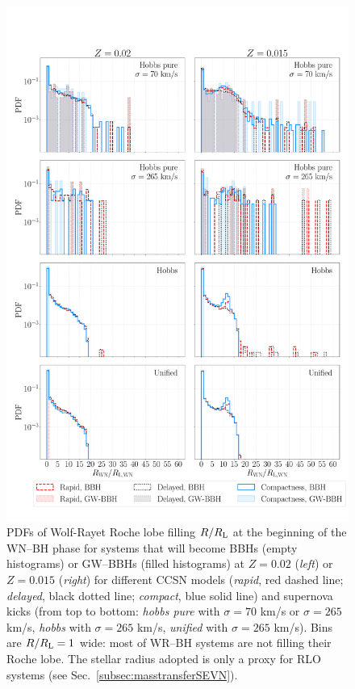 \documentclass[a4paper,titlepage]{book}     	%
\begin{document}
\begin{appendices}
\begin{figure}
	\centering
	\includegraphics[width=\textwidth]{./images/WRBH-RLfillWRnonpureHe.pdf}	
	\caption{PDFs of Wolf-Rayet Roche lobe filling $R/R_{\rm L}$ at the beginning of the WN--BH phase for systems that will become BBHs (empty histograms) or GW--BBHs (filled histograms) at $Z=0.02$ (\emph{left}) or $Z=0.015$ (\emph{right}) for different CCSN models (\emph{rapid}, red dashed line; \emph{delayed}, black dotted line; \emph{compact}, blue solid line) and supernova kicks (from top to bottom: \emph{hobbs pure} with $\sigma = 70$ km/s or $\sigma = 265$ km/s, \emph{hobbs} with $\sigma = 265$ km/s, \emph{unified} with $\sigma = 265$ km/s). Bins are $R/R_{\rm L} = 1$ wide: most of WR--BH systems are not filling their Roche lobe. The stellar radius adopted is only a proxy for RLO systems (see Sec.\ \ref{subsec:masstransferSEVN}).}\label{fig:resultsWRBH-RLfillnonpureHe}
\end{figure}


\end{appendices}
\end{document}
